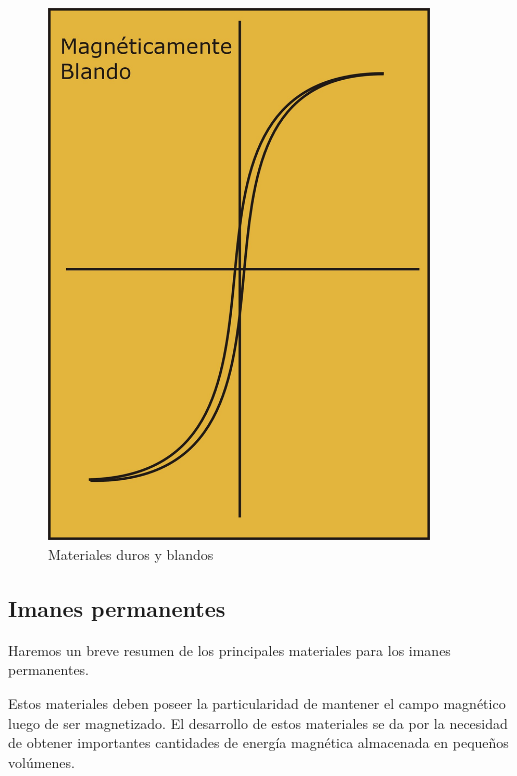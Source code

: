 \begin{figure}[H]
\begin{minipage}[b]{0.47\textwidth}
     \includegraphics[width=0.9\textwidth]{./Figures/materialesBlandos}
  \end{minipage}
  
  	\label{fig:materialesDurosBlandos}

  \caption{Materiales duros y blandos}
  
\end{figure}


\subsection{Imanes permanentes}

Haremos un breve resumen de los principales materiales para los imanes permanentes.

Estos materiales deben poseer la particularidad de mantener el campo
magnético luego de ser magnetizado. El desarrollo de estos materiales se da por la necesidad de obtener importantes cantidades de energía magnética almacenada en pequeños volúmenes.

